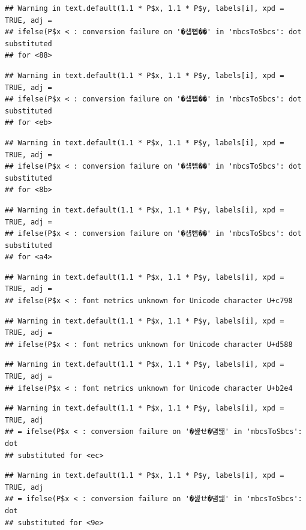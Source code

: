 \documentclass[
]{article}
\begin{document}
\begin{verbatim}
## Warning in text.default(1.1 * P$x, 1.1 * P$y, labels[i], xpd = TRUE, adj =
## ifelse(P$x < : conversion failure on '�섑뻽��' in 'mbcsToSbcs': dot substituted
## for <88>
\end{verbatim}

\begin{verbatim}
## Warning in text.default(1.1 * P$x, 1.1 * P$y, labels[i], xpd = TRUE, adj =
## ifelse(P$x < : conversion failure on '�섑뻽��' in 'mbcsToSbcs': dot substituted
## for <eb>
\end{verbatim}

\begin{verbatim}
## Warning in text.default(1.1 * P$x, 1.1 * P$y, labels[i], xpd = TRUE, adj =
## ifelse(P$x < : conversion failure on '�섑뻽��' in 'mbcsToSbcs': dot substituted
## for <8b>
\end{verbatim}

\begin{verbatim}
## Warning in text.default(1.1 * P$x, 1.1 * P$y, labels[i], xpd = TRUE, adj =
## ifelse(P$x < : conversion failure on '�섑뻽��' in 'mbcsToSbcs': dot substituted
## for <a4>
\end{verbatim}

\begin{verbatim}
## Warning in text.default(1.1 * P$x, 1.1 * P$y, labels[i], xpd = TRUE, adj =
## ifelse(P$x < : font metrics unknown for Unicode character U+c798
\end{verbatim}

\begin{verbatim}
## Warning in text.default(1.1 * P$x, 1.1 * P$y, labels[i], xpd = TRUE, adj =
## ifelse(P$x < : font metrics unknown for Unicode character U+d588
\end{verbatim}

\begin{verbatim}
## Warning in text.default(1.1 * P$x, 1.1 * P$y, labels[i], xpd = TRUE, adj =
## ifelse(P$x < : font metrics unknown for Unicode character U+b2e4
\end{verbatim}

\begin{verbatim}
## Warning in text.default(1.1 * P$x, 1.1 * P$y, labels[i], xpd = TRUE, adj
## = ifelse(P$x < : conversion failure on '�섎せ�덈떎' in 'mbcsToSbcs': dot
## substituted for <ec>
\end{verbatim}

\begin{verbatim}
## Warning in text.default(1.1 * P$x, 1.1 * P$y, labels[i], xpd = TRUE, adj
## = ifelse(P$x < : conversion failure on '�섎せ�덈떎' in 'mbcsToSbcs': dot
## substituted for <9e>
\end{verbatim}
\end{document}
